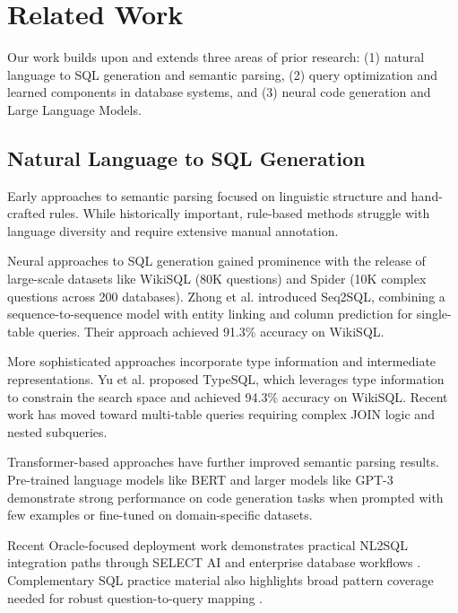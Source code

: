 \section{Related Work}
\label{sec:related}

Our work builds upon and extends three areas of prior research: (1) natural language to SQL generation and semantic parsing, (2) query optimization and learned components in database systems, and (3) neural code generation and Large Language Models.

\subsection{Natural Language to SQL Generation}

Early approaches to semantic parsing focused on linguistic structure and hand-crafted rules. While historically important, rule-based methods struggle with language diversity and require extensive manual annotation.

Neural approaches to SQL generation gained prominence with the release of large-scale datasets like WikiSQL (80K questions) and Spider (10K complex questions across 200 databases). Zhong et al. \cite{zhong2017seq2sql} introduced Seq2SQL, combining a sequence-to-sequence model with entity linking and column prediction for single-table queries. Their approach achieved 91.3\% accuracy on WikiSQL.

More sophisticated approaches incorporate type information and intermediate representations. Yu et al. \cite{yu2018typesql} proposed TypeSQL, which leverages type information to constrain the search space and achieved 94.3\% accuracy on WikiSQL. Recent work has moved toward multi-table queries requiring complex JOIN logic and nested subqueries.

Transformer-based approaches \cite{vaswani2017attention} have further improved semantic parsing results. Pre-trained language models like BERT \cite{devlin2018bert} and larger models like GPT-3 \cite{brown2020language} demonstrate strong performance on code generation tasks when prompted with few examples or fine-tuned on domain-specific datasets.

Recent Oracle-focused deployment work demonstrates practical NL2SQL integration paths through SELECT AI and enterprise database workflows \cite{mishra2026natural}. Complementary SQL practice material also highlights broad pattern coverage needed for robust question-to-query mapping \cite{mishra2026sqluniverse}.

